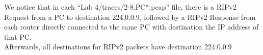 We notice that in each ``Lab 4/traces/2-8.PC*.pcap'' file, there is a RIPv2 Request from a PC to destination 224.0.0.9, followed by a RIPv2 Response from each router directly connected to the same PC with destination the IP address of that PC. \\
Afterwards, all destinations for RIPv2 packets have destination 224.0.0.9

